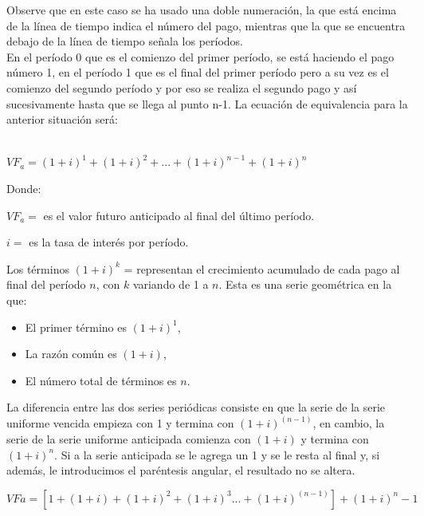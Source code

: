 	Observe que en este caso se ha usado una doble numeración, la que está encima de la línea de tiempo indica el número del pago, mientras que la que se encuentra debajo de la línea de tiempo señala los períodos. \\

	En el período 0 que es el comienzo del primer período, se está haciendo el pago número 1, en el período 1 que es el final del primer período pero a su vez es el comienzo del segundo período y por eso se realiza el segundo pago y así sucesivamente hasta que se llega al punto n-1. La ecuación de equivalencia para la anterior situación será:\\\\
	\vspace{5mm}
 \begin{center}
$VF_{a}=(1+i)^{1}  +(1+i)^{2}+...+(1+i)^{n-1}+(1+i)^{n}$
\end{center}
	\vspace{5mm}
	Donde:

		
		  $VF_a =$ es el valor futuro anticipado al final del último período.

		  $i =$ es la tasa de interés por período.

		  Los términos $(1+i)^k$ = representan el crecimiento acumulado de cada pago al final del período \(n\), con \(k\) variando de 1 a \(n\).
		  \vspace{5mm}
		  Esta es una serie geométrica en la que:

		  \begin{itemize}
			\item El primer término es \((1+i)^1\),
			\item La razón común es \((1+i)\),
			\item El número total de términos es \(n\).
		  \end{itemize}

		\vspace{5mm}
	
	
	
	La diferencia entre las dos series periódicas consiste en que la serie de la serie uniforme vencida empieza con 1 y termina con $(1+i)^{(n-1)}$, en cambio, la serie de la serie uniforme anticipada comienza con $(1+i)$  y termina con $(1+i)^{n}$. Si a la serie anticipada se le agrega un 1 y se le resta al final y, si además, le introducimos el paréntesis angular, el resultado no se altera.

	\vspace{5mm}
 \begin{center}
$VFa=[1+(1+i) +(1+i)^{2}+(1+i)^{3}...+(1+i)^{(n-1)} ]+(1+i)^{n} -1$
\end{center}
	\vspace{5mm}

